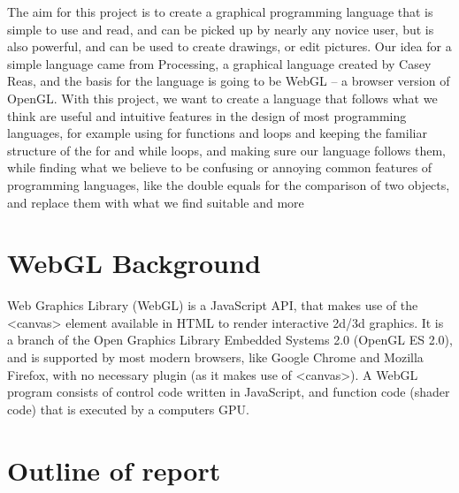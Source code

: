 \documentclass{l3proj}
\begin{document}
The aim for this project is to create a graphical programming language that is simple to use and read, and can be picked up by nearly any novice user, but is also powerful, and can be used to create drawings, or edit pictures. Our idea for a simple language came from Processing, a graphical language created by Casey Reas, and the basis for the language is going to be WebGL – a browser version of OpenGL. With this project, we want to create a language that follows what we think are useful and intuitive features in the design of most programming languages, for example using {} for functions and loops and keeping the familiar structure of the for and while loops, and making sure our language follows them, while finding what we believe to be confusing or annoying common features of programming languages, like the double equals for the comparison of two objects, and replace them with what we find suitable and more 

\section{WebGL Background}

Web Graphics Library (WebGL) is a JavaScript API, that makes use of the <canvas> element available in HTML to render interactive 2d/3d graphics. It is a branch of the Open Graphics Library Embedded Systems 2.0 (OpenGL ES 2.0), and is supported by most modern browsers, like Google Chrome and Mozilla Firefox, with no necessary plugin (as it makes use of <canvas>). A WebGL program consists of control code written in JavaScript, and function code (shader code) that is executed by a computers GPU. 

\section{Outline of report}
\end{document}
